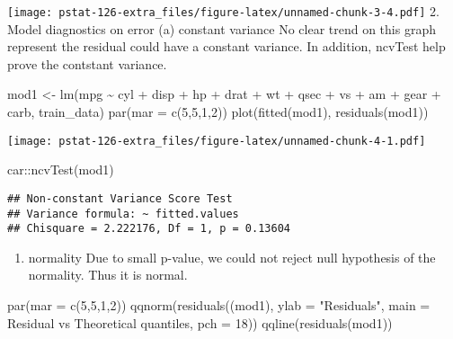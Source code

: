 \documentclass[
]{article}
\newenvironment{Shaded}{\begin{snugshade}}{\end{snugshade}}
\newcommand{\AttributeTok}[1]{\textcolor[rgb]{0.77,0.63,0.00}{#1}}
\newcommand{\DecValTok}[1]{\textcolor[rgb]{0.00,0.00,0.81}{#1}}
\newcommand{\FunctionTok}[1]{\textcolor[rgb]{0.00,0.00,0.00}{#1}}
\newcommand{\NormalTok}[1]{#1}
\newcommand{\OtherTok}[1]{\textcolor[rgb]{0.56,0.35,0.01}{#1}}
\newcommand{\SpecialCharTok}[1]{\textcolor[rgb]{0.00,0.00,0.00}{#1}}
\newcommand{\StringTok}[1]{\textcolor[rgb]{0.31,0.60,0.02}{#1}}
\providecommand{\tightlist}{%
  \setlength{\itemsep}{0pt}\setlength{\parskip}{0pt}}
\begin{document}
\texttt{[image: pstat-126-extra\_files/figure-latex/unnamed-chunk-3-4.pdf]}
2. Model diagnostics on error (a) constant variance No clear trend on
this graph represent the residual could have a constant variance. In
addition, ncvTest help prove the contstant variance.

\begin{Shaded}
\begin{Highlighting}[]
\NormalTok{mod1 }\OtherTok{\textless{}{-}} \FunctionTok{lm}\NormalTok{(mpg }\SpecialCharTok{\textasciitilde{}}\NormalTok{ cyl }\SpecialCharTok{+}\NormalTok{ disp }\SpecialCharTok{+}\NormalTok{ hp }\SpecialCharTok{+}\NormalTok{ drat }\SpecialCharTok{+}\NormalTok{ wt }\SpecialCharTok{+}\NormalTok{ qsec }\SpecialCharTok{+}\NormalTok{ vs }\SpecialCharTok{+}\NormalTok{ am }\SpecialCharTok{+}\NormalTok{ gear }\SpecialCharTok{+}\NormalTok{ carb,}
\NormalTok{           train\_data)}
\FunctionTok{par}\NormalTok{(}\AttributeTok{mar =} \FunctionTok{c}\NormalTok{(}\DecValTok{5}\NormalTok{,}\DecValTok{5}\NormalTok{,}\DecValTok{1}\NormalTok{,}\DecValTok{2}\NormalTok{))}
\FunctionTok{plot}\NormalTok{(}\FunctionTok{fitted}\NormalTok{(mod1), }\FunctionTok{residuals}\NormalTok{(mod1))}
\end{Highlighting}
\end{Shaded}

\texttt{[image: pstat-126-extra\_files/figure-latex/unnamed-chunk-4-1.pdf]}

\begin{Shaded}
\begin{Highlighting}[]
\NormalTok{car}\SpecialCharTok{::}\FunctionTok{ncvTest}\NormalTok{(mod1) }
\end{Highlighting}
\end{Shaded}

\begin{verbatim}
## Non-constant Variance Score Test 
## Variance formula: ~ fitted.values 
## Chisquare = 2.222176, Df = 1, p = 0.13604
\end{verbatim}

\begin{enumerate}
\def\labelenumi{(\alph{enumi})}
\setcounter{enumi}{1}
\tightlist
\item
  normality Due to small p-value, we could not reject null hypothesis of
  the normality. Thus it is normal.
\end{enumerate}

\begin{Shaded}
\begin{Highlighting}[]
\FunctionTok{par}\NormalTok{(}\AttributeTok{mar =} \FunctionTok{c}\NormalTok{(}\DecValTok{5}\NormalTok{,}\DecValTok{5}\NormalTok{,}\DecValTok{1}\NormalTok{,}\DecValTok{2}\NormalTok{))}
\FunctionTok{qqnorm}\NormalTok{(}\FunctionTok{residuals}\NormalTok{((mod1), }
                 \AttributeTok{ylab =} \StringTok{"Residuals"}\NormalTok{,}
                 \AttributeTok{main =} \StringTok{\textquotesingle{}Residual vs Theoretical quantiles\textquotesingle{}}\NormalTok{,}
                 \AttributeTok{pch =} \DecValTok{18}\NormalTok{))}
\FunctionTok{qqline}\NormalTok{(}\FunctionTok{residuals}\NormalTok{(mod1))}
\end{Highlighting}
\end{Shaded}
\end{document}
